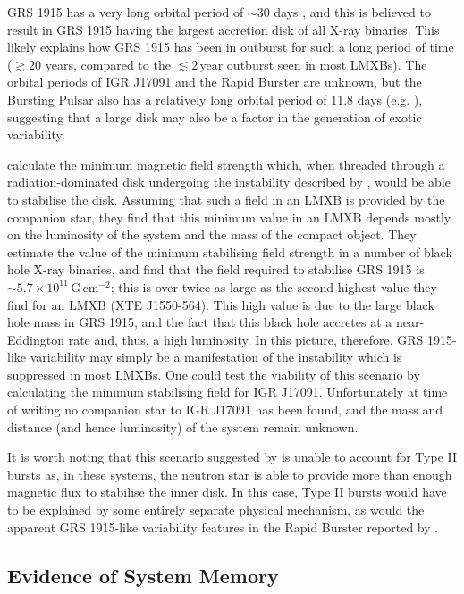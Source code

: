 \par GRS 1915 has a very long orbital period of $\sim30$ days \citep{Neil_GRSPeriod}, and this is believed to result in GRS 1915 having the largest accretion disk of all X-ray binaries.  This likely explains how GRS 1915 has been in outburst for such a long period of time ($\gtrsim20$ years, compared to the $\lesssim2$\,year outburst seen in most LMXBs).  The orbital periods of IGR J17091 and the Rapid Burster are unknown, but the Bursting Pulsar also has a relatively long orbital period of 11.8 days (e.g. \citealp{Finger_BP}), suggesting that a large disk may also be a factor in the generation of exotic variability.
\par \citet{Sadowski_MagField} calculate the minimum magnetic field strength which, when threaded through a radiation-dominated disk undergoing the instability described by \citet{Shakura_Instab}, would be able to stabilise the disk.  Assuming that such a field in an LMXB is provided by the companion star, they find that this minimum value in an LMXB depends mostly on the luminosity of the system and the mass of the compact object.  They estimate the value of the minimum stabilising field strength in a number of black hole X-ray binaries, and find that the field required to stabilise GRS 1915 is $\sim5.7\times10^{11}$\,G\,cm$^{-2}$; this is over twice as large as the second highest value they find for an LMXB (XTE J1550-564).  This high value is due to the large black hole mass in GRS 1915, and the fact that this black hole accretes at a near-Eddington rate and, thus, a high luminosity.  In this picture, therefore, GRS 1915-like variability may simply be a manifestation of the \citet{Shakura_Instab} instability which is suppressed in most LMXBs.  One could test the viability of this scenario by calculating the minimum stabilising field for IGR J17091.  Unfortunately at time of writing no companion star to IGR J17091 has been found, and the mass and distance (and hence luminosity) of the system remain unknown.
\par It is worth noting that this scenario suggested by \citet{Sadowski_MagField} is unable to account for Type II bursts as, in these systems, the neutron star is able to provide more than enough magnetic flux to stabilise the inner disk.  In this case, Type II bursts would have to be explained by some entirely separate physical mechanism, as would the apparent GRS 1915-like variability features in the Rapid Burster reported by \citet{Bagnoli_RB}.

\subsection{Evidence of System Memory}

